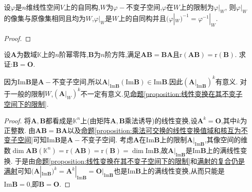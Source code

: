 \documentclass[lang=cn,newtx,10pt,scheme=chinese]{elegantbook}
\begin{document}
\begin{proposition}\label{proposition:自同构在其不变子空间下的限制}
    设\(\varphi\)是\(n\)维线性空间\(V\)上的自同构,\(W\)为\(\varphi -\)不变子空间,\(\varphi\)在\(W\)上的限制为\(\varphi|_W\),
    则\(\varphi|_W\)的像集与原像集相同且均为\(W\),\(\varphi|_W\)是\(W\)上的自同构并且\((\varphi|_W)^{-1} = \varphi^{-1}|_W\).
\end{proposition}
\begin{proof}
    
\end{proof}


\begin{example}
设\(\boldsymbol{A}\)为数域\(\mathbb{K}\)上的\(n\)阶幂零阵,\(\boldsymbol{B}\)为\(n\)阶方阵,满足\(\boldsymbol{A}\boldsymbol{B}=\boldsymbol{B}\boldsymbol{A}\)且\(\text{r}(\boldsymbol{A}\boldsymbol{B})=\text{r}(\boldsymbol{B})\). 求证:\(\boldsymbol{B}=\boldsymbol{O}\).
\end{example}
\begin{remark}
    因为$\text{Im}\boldsymbol{B}$是$\boldsymbol{A}-$不变子空间,所以\(\boldsymbol{A}|_{\text{Im}\boldsymbol{B}}(\text{Im}\boldsymbol{B})\in \text{Im}\boldsymbol{B}\).因此$(\boldsymbol{A}|_{\text{Im}\boldsymbol{B}})^k $有意义.
    对于一般的限制$W$,$(\boldsymbol{A}|_{W})^k $不一定有意义.见\hyperref[proposition:线性变换在其不变子空间下的限制]{命题\ref{proposition:线性变换在其不变子空间下的限制}}.
\end{remark}
\begin{proof}
    将\(\boldsymbol{A},\boldsymbol{B}\)都看成是\(\mathbb{K}^n\)上(由矩阵\(\boldsymbol{A},\boldsymbol{B}\)乘法诱导)的线性变换,设\(\boldsymbol{A}^k = \boldsymbol{O}\),其中\(k\)为正整数. 由\(\boldsymbol{A}\boldsymbol{B}=\boldsymbol{B}\boldsymbol{A}\)以及\hyperref[proposition:乘法可交换的线性变换值域和核互为不变子空间]{命题\ref{proposition:乘法可交换的线性变换值域和核互为不变子空间}}可知\(\text{Im}\boldsymbol{B}\)是\(\boldsymbol{A}-\)不变子空间. 考虑\(\boldsymbol{A}\)在\(\text{Im}\boldsymbol{B}\)上的限制\(\boldsymbol{A}|_{\text{Im}\boldsymbol{B}}\),其像空间的维数\(\dim\boldsymbol{A}\boldsymbol{B}(\mathbb{K}^n)=\text{r}(\boldsymbol{A}\boldsymbol{B})=\text{r}(\boldsymbol{B})=\dim\text{Im}\boldsymbol{B}\),故\(\boldsymbol{A}|_{\text{Im}\boldsymbol{B}}\)是\(\text{Im}\boldsymbol{B}\)上的满线性变换. 于是由\hyperref[proposition:线性变换在其不变子空间下的限制]{命题\ref{proposition:线性变换在其不变子空间下的限制}}和\hyperref[proposition:满射的复合仍是满射]{满射的复合仍是满射}可知\((\boldsymbol{A}|_{\text{Im}\boldsymbol{B}})^k = \boldsymbol{A}^k|_{\text{Im}\boldsymbol{B}}=\boldsymbol{O}|_{\text{Im}\boldsymbol{B}}\)也是\(\text{Im}\boldsymbol{B}\)上的满线性变换,从而只能是\(\text{Im}\boldsymbol{B}=0\),即\(\boldsymbol{B}=\boldsymbol{O}\). 
\end{proof}
\end{document}
